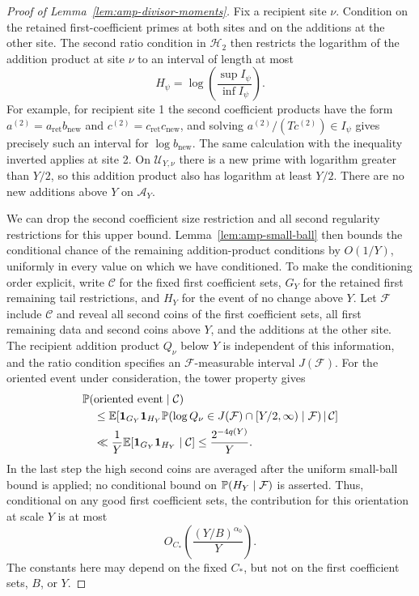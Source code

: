 \begin{proof}[Proof of Lemma~\ref{lem:amp-divisor-moments}]
Fix a recipient site $\nu$.  Condition on the retained
first-coefficient primes at both sites and on the additions at
the other site.  The second ratio condition in $\mathcal H_2$
then restricts the logarithm of the addition product at site
$\nu$ to an interval of length at most
\[
 H_\psi=\log\left(\frac{\sup I_\psi}{\inf I_\psi}\right).
\]
For example, for recipient site 1 the second coefficient
products have the form $a^{(2)}=a_{\mathrm{ret}}b_{\mathrm{new}}$
and $c^{(2)}=c_{\mathrm{ret}}c_{\mathrm{new}}$, and solving
$a^{(2)}/(Tc^{(2)})\in I_\psi$ gives precisely such an interval
for $\log b_{\mathrm{new}}$.  The same calculation with the
inequality inverted applies at site 2.  On
$\mathcal U_{Y,\nu}$ there is a new prime with logarithm greater
than $Y/2$, so this addition product also has logarithm at least
$Y/2$.  There are no new additions above $Y$ on
$\mathcal A_Y$.

We can drop the second coefficient size restriction and all
second regularity restrictions for this upper bound.
Lemma~\ref{lem:amp-small-ball} then bounds the conditional chance
of the remaining addition-product conditions by $O(1/Y)$,
uniformly in every value on which we have conditioned.
To make the conditioning order explicit, write $\mathcal C$ for the
fixed first coefficient sets, $G_Y$ for the retained first remaining
tail restrictions, and $H_Y$ for the event of no change above $Y$.
Let $\mathcal F$ include $\mathcal C$ and reveal all second coins of
the first coefficient sets, all first remaining data and second coins
above $Y$, and the additions at the other site.  The recipient
addition product $Q_\nu$ below $Y$ is independent of this information,
and the ratio condition specifies an $\mathcal F$-measurable interval
$J(\mathcal F)$.  For the oriented event under consideration, the
tower property gives
\[
\begin{aligned}
 &\mathbb P(\text{oriented event}\mid\mathcal C)\\
 &\quad\le \mathbb E\!\left[\mathbf 1_{G_Y}\mathbf 1_{H_Y}
   \mathbb P\!\left(\log Q_\nu\in J(\mathcal F)\cap[Y/2,\infty)
        \mid\mathcal F\right)\,\middle|\,\mathcal C\right]\\
 &\quad\ll \frac1Y\mathbb E[\mathbf 1_{G_Y}\mathbf 1_{H_Y}\mid\mathcal C]
 \le \frac{2^{-4q(Y)}}Y.
\end{aligned}
\]
In the last step the high second coins are averaged after the
uniform small-ball bound is applied; no conditional bound on
$\mathbb P(H_Y\mid\mathcal F)$ is asserted.
Thus, conditional on any good first coefficient sets, the
contribution for this orientation at scale $Y$ is at most
\[
 O_{C_*}\left(\frac{(Y/B)^{\alpha_0}}{Y}\right).
\]
The constants here may depend on the fixed $C_*$, but not on
the first coefficient sets, $B$, or $Y$.


\end{proof}

